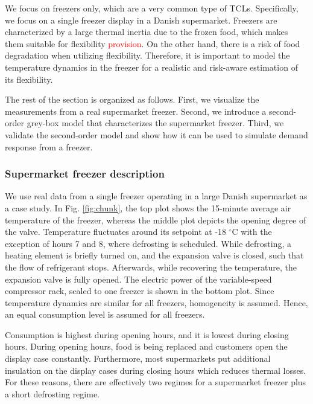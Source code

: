 \documentclass[11pt,a4paper]{article}
\begin{document}
We focus on freezers only, which are a very common type of TCLs. Specifically, we focus on a single freezer display in a Danish supermarket. Freezers are characterized by a large thermal inertia due to the frozen food, which makes them suitable for flexibility \textcolor{red}{provision}. On the other hand, there is a risk of food degradation when utilizing flexibility. Therefore, it is important to model the temperature dynamics in the freezer for a realistic and risk-aware estimation of its flexibility.

The rest of the section is organized as follows. First, we visualize the measurements from a real supermarket freezer. Second, we introduce a second-order grey-box model that characterizes the supermarket freezer. Third, we validate the second-order model and show how it can be used to simulate demand response from a freezer.

\subsubsection{Supermarket freezer description}

We use real data from a single freezer operating in a large Danish supermarket as a case study.
In Fig. \ref{fig:chunk}, the top plot shows the 15-minute average air temperature of the freezer, whereas the middle plot depicts the opening degree of the valve.
%
Temperature fluctuates around its setpoint at -18 $^{\circ}$C with the exception of hours 7 and 8, where defrosting is scheduled.
While defrosting, a heating element is briefly turned on, and the expansion valve is closed, such that the flow of refrigerant stops. Afterwards, while recovering the temperature, the expansion valve is fully opened.
The electric power of the variable-speed compressor rack, scaled to one freezer is shown in the bottom plot. Since temperature dynamics are similar for all freezers, homogeneity is assumed. Hence, an equal consumption level is assumed for all freezers.

Consumption is highest during opening hours, and it is lowest during closing hours.
During opening hours, food is being replaced and customers open the display case constantly.
Furthermore, most supermarkets put additional insulation on the display cases during closing hours which reduces thermal losses.
For these reasons, there are effectively two regimes for a supermarket freezer plus a short defrosting regime.
\end{document}
